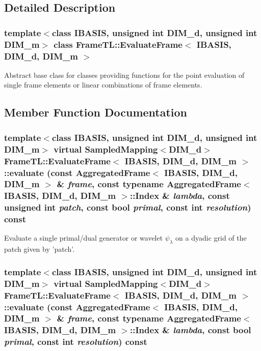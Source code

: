 \begin{CompactItemize}
\end{CompactItemize}


\subsection{Detailed Description}
\subsubsection*{template$<$class IBASIS, unsigned int DIM\_\-d, unsigned int DIM\_\-m$>$ class FrameTL::EvaluateFrame$<$ IBASIS, DIM\_\-d, DIM\_\-m $>$}

Abstract base class for classes providing functions for the point evaluation of single frame elements or linear combinations of frame elements. 

\subsection{Member Function Documentation}
\hypertarget{classFrameTL_1_1EvaluateFrame_974094ff59dc684362f5237ea8813014}{
\subsubsection[evaluate]{\setlength{\rightskip}{0pt plus 5cm}template$<$class IBASIS, unsigned int DIM\_\-d, unsigned int DIM\_\-m$>$ virtual SampledMapping$<$DIM\_\-d$>$ {\bf FrameTL::EvaluateFrame}$<$ IBASIS, DIM\_\-d, DIM\_\-m $>$::evaluate (const {\bf AggregatedFrame}$<$ IBASIS, DIM\_\-d, DIM\_\-m $>$ \& {\em frame}, \/  const typename {\bf AggregatedFrame}$<$ IBASIS, DIM\_\-d, DIM\_\-m $>$::Index \& {\em lambda}, \/  const unsigned int {\em patch}, \/  const bool {\em primal}, \/  const int {\em resolution}) const}}
\label{classFrameTL_1_1EvaluateFrame_974094ff59dc684362f5237ea8813014}


Evaluate a single primal/dual generator or wavelet $\psi_\lambda$ on a dyadic grid of the patch given by 'patch'. \hypertarget{classFrameTL_1_1EvaluateFrame_3315369302b4dfb8e73a7dae1658fc20}{
\subsubsection[evaluate]{\setlength{\rightskip}{0pt plus 5cm}template$<$class IBASIS, unsigned int DIM\_\-d, unsigned int DIM\_\-m$>$ virtual SampledMapping$<$DIM\_\-d$>$ {\bf FrameTL::EvaluateFrame}$<$ IBASIS, DIM\_\-d, DIM\_\-m $>$::evaluate (const {\bf AggregatedFrame}$<$ IBASIS, DIM\_\-d, DIM\_\-m $>$ \& {\em frame}, \/  const typename {\bf AggregatedFrame}$<$ IBASIS, DIM\_\-d, DIM\_\-m $>$::Index \& {\em lambda}, \/  const bool {\em primal}, \/  const int {\em resolution}) const}}
\label{classFrameTL_1_1EvaluateFrame_3315369302b4dfb8e73a7dae1658fc20}


